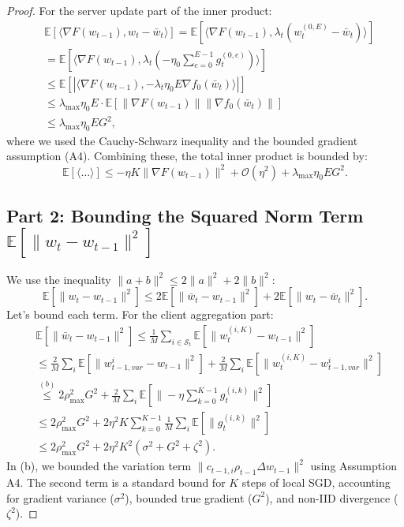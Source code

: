 \documentclass[11pt]{article}
\begin{document}
\begin{proof}
For the server update part of the inner product:
\begin{align}
    &\mathbb{E}[\langle \nabla F(w_{t-1}), w_t - \bar{w}_t \rangle] = \mathbb{E}[\langle \nabla F(w_{t-1}), \lambda_t(w_t^{(0,E)} - \bar{w}_t) \rangle] \nonumber \\
    &= \mathbb{E}[\langle \nabla F(w_{t-1}), \lambda_t(-\eta_0 \sum_{e=0}^{E-1} g_t^{(0,e)}) \rangle] \nonumber \\
    &\le \mathbb{E}[|\langle \nabla F(w_{t-1}), -\lambda_t \eta_0 E \nabla f_0(\bar{w}_t) \rangle|] \nonumber \\
    &\le \lambda_{\max}\eta_0 E \cdot \mathbb{E}[\|\nabla F(w_{t-1})\| \|\nabla f_0(\bar{w}_t)\|] \nonumber \\
    &\le \lambda_{\max}\eta_0 E G^2,
\end{align}
where we used the Cauchy-Schwarz inequality and the bounded gradient assumption (A4).
Combining these, the total inner product is bounded by:
\begin{equation}
    \mathbb{E}[\langle \dots \rangle] \le -\eta K \|\nabla F(w_{t-1})\|^2 + \mathcal{O}(\eta^2) + \lambda_{\max}\eta_0 E G^2. \label{eq:bound_inner_prod_supp}
\end{equation}

\subsection{Part 2: Bounding the Squared Norm Term $\mathbb{E}[\|w_t - w_{t-1}\|^2]$}

We use the inequality $\|a+b\|^2 \le 2\|a\|^2 + 2\|b\|^2$:
\begin{equation}
    \mathbb{E}[\|w_t - w_{t-1}\|^2] \le 2\mathbb{E}[\|\bar{w}_t - w_{t-1}\|^2] + 2\mathbb{E}[\|w_t - \bar{w}_t\|^2].
\end{equation}
Let's bound each term. For the client aggregation part:
\begin{align}
    &\mathbb{E}[\|\bar{w}_t - w_{t-1}\|^2] \le \frac{1}{M}\sum_{i \in \mathcal{S}_t} \mathbb{E}[\|w_t^{(i,K)} - w_{t-1}\|^2] \nonumber \\
    &\le \frac{2}{M}\sum_{i} \mathbb{E}[\|w_{t-1,var}^i - w_{t-1}\|^2] + \frac{2}{M}\sum_{i} \mathbb{E}[\|w_t^{(i,K)} - w_{t-1,var}^i\|^2] \nonumber \\
    &\overset{(b)}{\le} 2\rho_{\max}^2 G^2 + \frac{2}{M}\sum_{i} \mathbb{E}[\|-\eta \sum_{k=0}^{K-1} g_t^{(i,k)}\|^2] \nonumber \\
    &\le 2\rho_{\max}^2 G^2 + 2\eta^2 K \sum_{k=0}^{K-1} \frac{1}{M}\sum_i \mathbb{E}[\|g_t^{(i,k)}\|^2] \nonumber \\
    &\le 2\rho_{\max}^2 G^2 + 2\eta^2 K^2 (\sigma^2 + G^2 + \zeta^2).
\end{align}
In (b), we bounded the variation term $\|c_{t-1,i} \rho_{t-1} \Delta w_{t-1}\|^2$ using Assumption A4. The second term is a standard bound for $K$ steps of local SGD, accounting for gradient variance ($\sigma^2$), bounded true gradient ($G^2$), and non-IID divergence ($\zeta^2$).


\end{proof}
\end{document}

